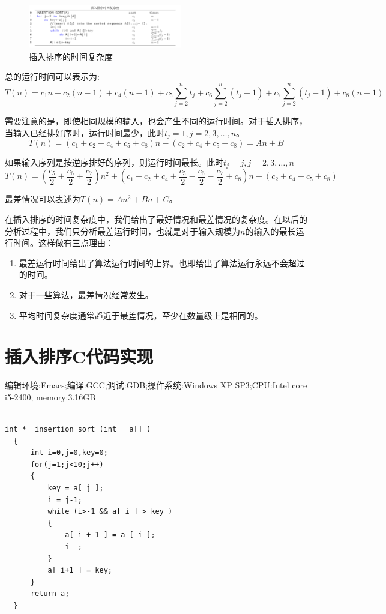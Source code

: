 \documentclass[10pt,a4paper,UTF8]{article}
\begin{document}
\begin{figure}[htbp]
\centering
\includegraphics[width=0.6\textwidth]{../../img/computer_algorithms/20170702insertionSortComplexity.png}
\caption{\label{fig:org08ee299}
插入排序的时间复杂度}
\end{figure}


总的运行时间可以表示为:
\begin{equation}
\label{eq:1}
  T(n) = c_1n + c_2(n-1) + c_4(n-1) + c_5\sum_{j=2}^nt_j + c_6\sum_{j=2}^n(t_j-1) + c_7 \sum_{j=2}^n(t_j-1) + c_8(n-1)
\end{equation}

需要注意的是，即使相同规模的输入，也会产生不同的运行时间。对于插入排序，当输入已经排好序时，运行时间最少，此时\(t_j=1,j=2,3,\ldots,n\)。
\begin{equation}
\label{eq:2}
  T(n) = (c_1 + c_2 + c_4 + c_5 + c_8)n - (c_2 + c_4 + c_5 + c_8) = An+B
\end{equation}

如果输入序列是按逆序排好的序列，则运行时间最长。此时\(t_j=j,j=2,3,\ldots,n\)
\begin{equation}
\label{eq:3}
  T(n) = (\frac{c_5}{2} + \frac{c_6}{2} +\frac{c_7}{2} )n^2 + (c_1 + c_2 + c_4+\frac{c_5}{2}- \frac{c_6}{2}-\frac{c_7}{2}+c_8)n -(c_2 + c_4 + c_5 + c_8)
\end{equation}

最差情况可以表述为\(T(n)=An^2+Bn+C\)。

在插入排序的时间复杂度中，我们给出了最好情况和最差情况的复杂度。在以后的分析过程中，我们只分析最差运行时间，也就是对于输入规模为\(n\)的输入的最长运行时间。这样做有三点理由：

\begin{enumerate}
\item 最差运行时间给出了算法运行时间的上界。也即给出了算法运行永远不会超过的时间。
\item 对于一些算法，最差情况经常发生。
\item 平均时间复杂度通常趋近于最差情况，至少在数量级上是相同的。
\end{enumerate}

\section{插入排序C代码实现}
\label{sec:org261650b}

编辑环境:Emacs;编译:GCC;调试:GDB;操作系统:Windows XP SP3;CPU:Intel core i5-2400; memory:3.16GB

\lstset{language=C,label= ,caption= ,captionpos=b,firstnumber=1,numbers=left}
\begin{lstlisting}

int *  insertion_sort (int   a[] )
  {
      int i=0,j=0,key=0;
      for(j=1;j<10;j++)
      {
          key = a[ j ];
          i = j-1;
          while (i>-1 && a[ i ] > key )
          {
              a[ i + 1 ] = a [ i ];
              i--;
          }
          a[ i+1 ] = key;
      }
      return a;
  }
\end{lstlisting}
\end{document}
